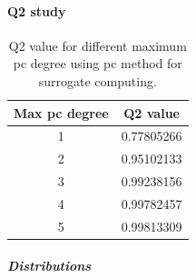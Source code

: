 \paragraph{Q2 study}
\hspace{1cm}

\begin{table}
\begin{tabular}{|c|c|}
  \hline
  Max pc degree & Q2 value \\
  \hline
  1 & 0.77805266\\
  2 & 0.95102133\\
  3 & 0.99238156\\
  4 & 0.99782457\\
  5 & 0.99813309\\
  \hline
\end{tabular}
\caption{Q2 value for different maximum pc degree using pc method for surrogate computing.}
\label{influence_degree_method_surrogate_pc_Q2}
\end{table}

\subparagraph{Distributions}
\hspace{1cm}

